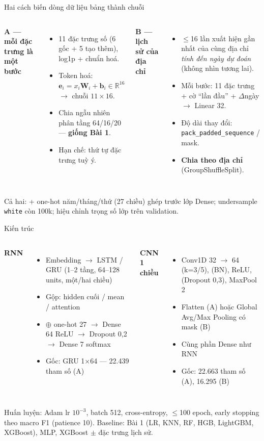 \documentclass[aspectratio=169,11pt]{beamer}
\newcommand{\code}[1]{\texttt{#1}}
\begin{document}
\begin{frame}{Hai cách biến dòng dữ liệu bảng thành chuỗi}
\begin{columns}[T]
\textbf{A --- mỗi đặc trưng là một bước}
\begin{itemize}\small
\item 11 đặc trưng số (6 gốc + 5 tạo thêm), log1p + chuẩn hoá.
\item Token hoá: $\mathbf{e}_i = x_i\mathbf{W}_i + \mathbf{b}_i \in \mathbb{R}^{16}$ $\to$ chuỗi $11\times16$.
\item Chia ngẫu nhiên phân tầng 64/16/20 --- \textbf{giống Bài 1}.
\item Hạn chế: thứ tự đặc trưng tuỳ ý.
\end{itemize}
\textbf{B --- lịch sử của địa chỉ}
\begin{itemize}\small
\item $\le$16 lần xuất hiện gần nhất của cùng địa chỉ \emph{tính đến ngày dự đoán} (không nhìn tương lai).
\item Mỗi bước: 11 đặc trưng + cờ ``lần đầu'' + $\Delta$ngày $\to$ Linear 32.
\item Độ dài thay đổi: \code{pack\_padded\_sequence} / mask.
\item \textbf{Chia theo địa chỉ} (GroupShuffleSplit).
\end{itemize}
\end{columns}
\vspace{6pt}
\small Cả hai: + one-hot năm/tháng/thứ (27 chiều) ghép trước lớp Dense; undersample \code{white} còn 100k; hiệu chỉnh trọng số lớp trên validation.
\end{frame}

\begin{frame}{Kiến trúc}
\begin{columns}[T]
\textbf{RNN}
\begin{itemize}\small
\item Embedding $\to$ LSTM / GRU (1--2 tầng, 64--128 units, một/hai chiều)
\item Gộp: hidden cuối / mean / attention
\item $\oplus$ one-hot 27 $\to$ Dense 64 ReLU $\to$ Dropout 0,2 $\to$ Dense 7 softmax
\item Gốc: GRU 1×64 --- 22.439 tham số (A)
\end{itemize}
\textbf{CNN 1 chiều}
\begin{itemize}\small
\item Conv1D 32 $\to$ 64 (k=3/5), (BN), ReLU, (Dropout 0,3), MaxPool 2
\item Flatten (A) hoặc Global Avg/Max Pooling có mask (B)
\item Cùng phần Dense như RNN
\item Gốc: 22.663 tham số (A), 16.295 (B)
\end{itemize}
\end{columns}
\vspace{6pt}
\small Huấn luyện: Adam lr $10^{-3}$, batch 512, cross-entropy, $\le$100 epoch, early stopping theo macro F1 (patience 10).
Baseline: Bài 1 (LR, KNN, RF, HGB, LightGBM, XGBoost), MLP, XGBoost $\pm$ đặc trưng lịch sử.
\end{frame}
\end{document}
